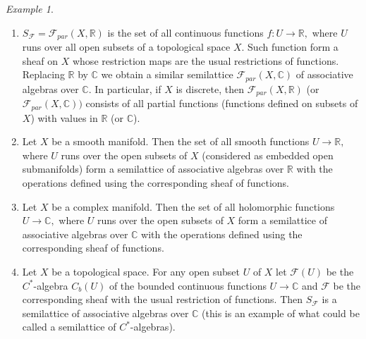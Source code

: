 \documentclass{amsart}
\newcommand{\R}{\mathbb{R}}
\newcommand{\C}{\mathbb{C}}
\newcommand{\0}{{\vartheta}}
\theoremstyle{definition}
\theoremstyle{remark}
\newtheorem{ex}[thm]{Example}
\numberwithin{equation}{section}
\newtheorem*{Theorem A}{\textbf{Theorem A}}
\newtheorem*{Corollary E}{\textbf{Corollary E}}
\newtheorem*{Corollary F}{\textbf{Corollary F}}
\newtheorem*{Theorem B}{\textbf{Theorem B}}
\newtheorem*{Theorem C}{\textbf{Theorem C}}
\newtheorem*{Theorem D}{\textbf{Theorem B}}
\newtheorem*{p a}{\textbf{Proof of  Theorem A}}
\newtheorem*{p b}{\textbf{Proof of Theorem B}}
\newtheorem*{p c}{\textbf{Proof of  Theorem C}}
\newtheorem*{p d}{\textbf{Proof of  Theorem D}}
\begin{document}
\begin{ex}
\begin{enumerate}
\item 
$S_{\mathcal F}= {\mathcal F}_{par}(X,\R )$ is the set 
 of all continuous functions $f:U\to \R,$ where $U$ runs over all open subsets of a topological space $X.$ Such function form a sheaf on $X$ whose restriction maps are the usual restrictions of functions. 
 Replacing $\R$ by $\C$ we obtain a similar semilattice ${\mathcal F}_{par}(X,\C )$ of associative algebras over $\C .$ In particular, if $X$ is discrete, then ${\mathcal F}_{par}(X,\R )$ (or  ${\mathcal F}_{par}(X,\C ))$ consists of all partial functions (functions defined on subsets of $X$) with values in $\R$ (or $\C$). \\
 

\item Let $X$ be a smooth manifold. Then the set of all smooth functions $U \to \R,$ where $U$ runs over the open subsets of $X$ (considered as embedded open submanifolds) form  a semilattice of associative algebras over $\R$ with the operations defined using the corresponding sheaf of functions.\\



\item Let $X$ be a complex manifold. Then the set of all holomorphic  functions $U \to \C,$ where $U$ runs over the open subsets of $X$ form  a semilattice of associative algebras over $\C$ with the operations defined using the corresponding sheaf of functions.\\

\item Let $X$ be a topological space. For any open subset $U$ of $X$ let ${\mathcal F} (U) $ be the $C^*$-algebra   $C_b(U )$ of the   bounded continuous functions $U\to \C$ and ${\mathcal F} $ be the corresponding sheaf with the usual restriction of functions. Then $S_{\mathcal F}$ is  a semilattice of associative algebras over $\C$  (this is an example of what could be called a semilattice of $C^*$-algebras).\\


\end{enumerate}
\end{ex}
\end{document}
